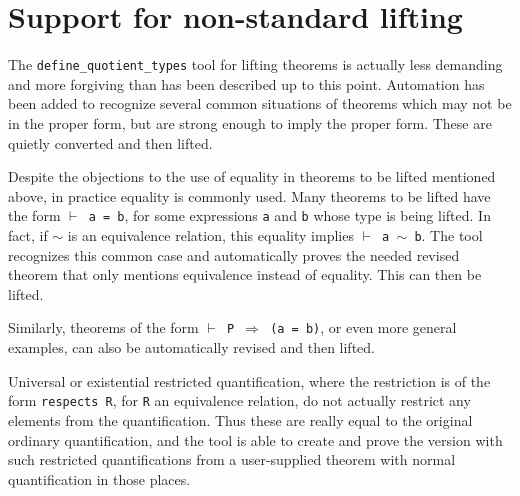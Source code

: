 \documentclass[envcountsame,runningheads]{llncs}
\begin{document}
\begin{comment}
Generally, any mention of equality between elements of a type being
lifted will make a theorem not liftable.  A variant of the theorem
should be proven which substitutes equivalence for the equality.
%
This should really not be surprising, since the purpose of collapsing
equivalence classes into single entities is meant to render the results
indistinguishable.  Therefore properties which rely on those distinctions
will not translate to the higher level, which in particular excludes
the equality relation between values which are now being declared as
equivalent.

\end{comment}


%
\section{Support for non-standard lifting}
%
\label{nonstandard}

The {\tt define\_quotient\_types} tool
for lifting theorems is actually less
demanding and more forgiving than has been described up to this point.
Automation has been added to recognize several common
situations of theorems which may not be in the proper form, but are
strong enough to imply the proper form.  These are quietly converted
and then lifted.

Despite the objections to the use of equality
in theorems to be lifted mentioned above, in practice equality is commonly used.
Many theorems to be lifted have the form 
{\tt $\vdash$ a = b}, for some expressions {\tt a} and {\tt b} whose type is
being lifted. 
In fact,
if $\sim$ is an equivalence relation,
this equality implies {\tt $\vdash$ a $\sim$ b}.
The tool recognizes this common case and automatically proves
the needed revised
theorem that only mentions equivalence instead of equality. 
This can then be lifted. 

Similarly, theorems of the form {\tt $\vdash$ P $\Rightarrow$ (a = b)}, or even more
general examples, can also be
automatically revised and then lifted. 

Universal or existential restricted quantification, where the 
restriction is of the form {\tt respects R}, for {\tt R} an equivalence
relation, do not actually restrict any elements from the quantification.
Thus these are really equal to the original ordinary quantification,
and the tool is able to create and prove the version with such
restricted quantifications from a user-supplied theorem with normal
quantification in those places.
\end{document}

